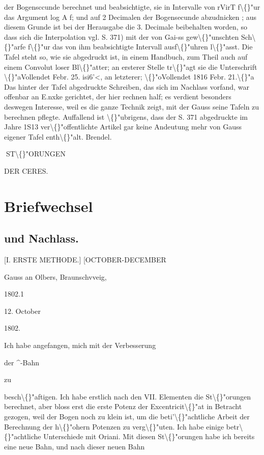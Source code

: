 \documentclass[10pt,a4paper]{article}
\begin{document}
der Bogensccunde berechnet und beabsichtigte, sie in Intervalle von rVirT f\textbackslash\{\}"ur das Argument log A f; und auf
2 Decimalen der Bogensecunde abzudnicken ; aus diesem Grunde ist bei der Herausgabe die 3. Decimale
beibehalten worden, so dass sich die Interpolation vgl. S. 371) mit der von Gai-ss gew\textbackslash\{\}"unschten Sch\textbackslash\{\}"arfe
f\textbackslash\{\}"ur das von ihm beabsichtigte Intervall ausf\textbackslash\{\}"uhren l\textbackslash\{\}"asst.
Die Tafel steht so, wie sie abgedruckt ist, in einem Handbuch, zum Theil auch auf einem Convolut
loser Bl\textbackslash\{\}"atter; an ersterer Stelle tr\textbackslash\{\}"agt sie die Unterschrift \textbackslash\{\}"aVollendet Febr. 25. isi6'<, an letzterer; \textbackslash\{\}"oVollendet 1816 Febr. 21.\textbackslash\{\}"a
Das hinter der Tafel abgedruckte Schreiben, das sich im Nachlass vorfand, war offenbar an E.nxke
gerichtet, der hier rechnen half; es verdient besonders deswegen Interesse, weil es die ganze Technik zeigt,
mit der Gauss seine Tafeln zu berechnen pflegte.
Auffallend ist \textbackslash\{\}"ubrigens, dass der S. 371 abgedruckte im Jahre 1S13 ver\textbackslash\{\}"offentlichte Artikel gar keine
Andeutung mehr von Gauss eigener Tafel enth\textbackslash\{\}"alt.
Brendel.

\newpage
ST\textbackslash\{\}"ORUNGEN

DER CERES.

\newpage
\section*{Briefwechsel}

\subsection*{und Nachlass.}

[I. ERSTE METHODE.]
[OCTOBER-DECEMBER

Gauss an Olbers, Braunschvveig,

1802.1

12. October

1802.

Ich habe angefangen, mich mit der Verbesserung

der \textasciicircum{}-Bahn

zu

besch\textbackslash\{\}"aftigen. Ich habe erstlich nach den VII. Elementen die St\textbackslash\{\}"orungen berechnet, aber bloss erst die erste Potenz der Excentricit\textbackslash\{\}"at in Betracht gezogen,
weil der Bogen noch zu klein ist, um die beti'\textbackslash\{\}"achtliche Arbeit der Berechnung
der h\textbackslash\{\}"ohern Potenzen zu verg\textbackslash\{\}"uten. Ich habe einige betr\textbackslash\{\}"achtliche Unterschiede
mit Oriani. Mit diesen St\textbackslash\{\}"orungen habe ich bereits eine neue Bahn, und nach
dieser neuen Bahn
\end{document}

